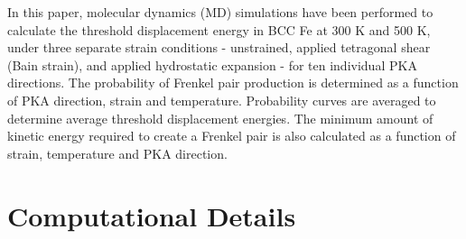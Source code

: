 \documentclass[review]{elsarticle}
\begin{document}
In this paper, molecular dynamics (MD) \cite{abraham1986, allen1987} simulations have been performed to calculate the threshold displacement energy in BCC Fe at 300 K and 500 K, under three separate strain conditions - unstrained, applied tetragonal shear (Bain strain), and applied hydrostatic expansion - for ten individual PKA directions.  The probability of Frenkel pair production is determined as a function of PKA direction, strain and temperature.  Probability curves are averaged to determine average threshold displacement energies.  The minimum amount of kinetic energy required to create a Frenkel pair is also calculated as a function of strain, temperature and PKA direction.

\section{Computational Details}
\end{document}
